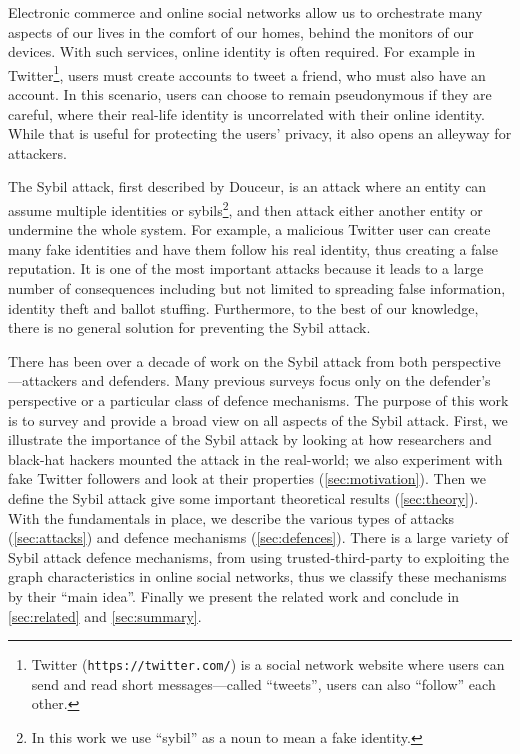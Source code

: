 Electronic commerce and online social networks allow us to orchestrate many
aspects of our lives in the comfort of our homes, behind the monitors of our
devices. With such services, online identity is often required. For example in
Twitter\footnote{Twitter (\texttt{https://twitter.com/}) is a social network website
  where users can send and read short messages---called ``tweets'', users can
  also ``follow'' each other.}, users must create accounts to tweet a friend,
who must also have an account. In this scenario, users can choose to remain
pseudonymous if they are careful, where their real-life identity is uncorrelated
with their online identity. While that is useful for protecting the users'
privacy, it also opens an alleyway for attackers.

The Sybil attack, first described by Douceur\cite{douceur2002sybil}, is an
attack where an entity can assume multiple identities or sybils\footnote{In this
  work we use ``sybil'' as a noun to mean a fake identity.}, and then attack
either another entity or undermine the whole system. For example, a malicious
Twitter user can create many fake identities and have them follow his real
identity, thus creating a false reputation. It is one of the most important
attacks because it leads to a large number of consequences including but not
limited to spreading false information, identity theft\cite{bilge2009all} and
ballot stuffing\cite{bhattacharjee2005avoiding}. Furthermore, to the best of our
knowledge, there is no general solution for preventing the Sybil attack.

There has been over a decade of work on the Sybil attack from both
perspective---attackers and defenders. Many previous surveys focus only on the
defender's perspective or a particular class of defence mechanisms. The purpose
of this work is to survey and provide a broad view on all aspects of the Sybil
attack. First, we illustrate the importance of the Sybil attack by looking at
how researchers and black-hat hackers mounted the attack in the real-world; we
also experiment with fake Twitter followers and look at their properties
(\autoref{sec:motivation}). Then we define the Sybil attack give some important
theoretical results (\autoref{sec:theory}). With the fundamentals in place, we
describe the various types of attacks (\autoref{sec:attacks}) and defence
mechanisms (\autoref{sec:defences}). There is a large variety of Sybil attack
defence mechanisms, from using trusted-third-party to exploiting the graph
characteristics in online social networks, thus we classify these mechanisms by
their ``main idea''. Finally we present the related work and conclude in
\autoref{sec:related} and \autoref{sec:summary}.

